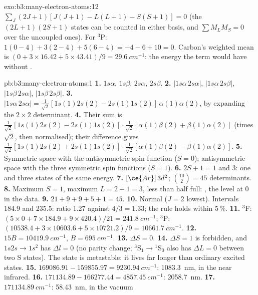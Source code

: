 \begin{solution}{exo:b3:many-electron-atoms:12}
$\sum_J(2J+1)[J(J+1) - L(L+1) - S(S+1)] = 0$ (the $(2L+1)(2S+1)$ states can
be counted in either basis, and $\sum M_LM_S = 0$ over the uncoupled ones).
For ${}^3$P: $1(0 - 4) + 3(2 - 4) + 5(6 - 4) = -4 - 6 + 10 = 0$. Carbon's
weighted mean is $(0 + 3 \times 16.42 + 5 \times 43.41)/9 = \qty{29.6}{cm^{-1}}$:
the energy the term would have without .
\end{solution}

\begin{solution}{pb:b3:many-electron-atoms:1}
\textbf{1.} $1s\alpha$, $1s\beta$, $2s\alpha$, $2s\beta$.
\textbf{2.} $|1s\alpha\,2s\alpha|$, $|1s\alpha\,2s\beta|$, $|1s\beta\,2s\alpha|$,
$|1s\beta\,2s\beta|$.
\textbf{3.} $|1s\alpha\,2s\alpha| = \frac{1}{\sqrt2}[1s(1)2s(2) - 2s(1)1s(2)]\,
\alpha(1)\alpha(2)$, by expanding the $2\times2$ determinant.
\textbf{4.} Their sum is $\frac{1}{\sqrt2}[1s(1)2s(2) - 2s(1)1s(2)]\cdot
\frac{1}{\sqrt2}[\alpha(1)\beta(2) + \beta(1)\alpha(2)]$ (times $\sqrt2$, then
normalised); their difference gives $\frac{1}{\sqrt2}[1s(1)2s(2) +
2s(1)1s(2)]\cdot\frac{1}{\sqrt2}[\alpha(1)\beta(2) - \beta(1)\alpha(2)]$.
\textbf{5.} Symmetric space with the antisymmetric spin function ($S = 0$);
antisymmetric space with the three symmetric spin functions ($S = 1$).
\textbf{6.} $2S + 1 = 1$ and 3: one and three states of the same energy.
\textbf{7.} $[\ce{Ar}]\,3d^2$; $\binom{10}{2} = 45$ determinants.
\textbf{8.} Maximum $S = 1$, maximum $L = 2 + 1 = 3$, less than half full:
, the level at 0 in the data.
\textbf{9.} $21 + 9 + 9 + 5 + 1 = 45$.
\textbf{10.} Normal ($J = 2$ lowest). Intervals 184.9 and 235.5: ratio 1.27
against $4/3 = 1.33$; the rule holds within 5\,\%.
\textbf{11.} ${}^3$F: $(5 \times 0 + 7 \times 184.9 + 9 \times 420.4)/21 =
\qty{241.8}{cm^{-1}}$; ${}^3$P: $(10538.4 + 3 \times 10603.6 + 5 \times
10721.2)/9 = \qty{10661.7}{cm^{-1}}$.
\textbf{12.} $15B = \qty{10419.9}{cm^{-1}}$, $B = \qty{695}{cm^{-1}}$.
\textbf{13.} $\Delta S = 0$.
\textbf{14.} $\Delta S = 1$ is forbidden, and $1s2s \to 1s^2$ has $\Delta l = 0$
(no parity change; ${}^3$S$_1 \to {}^1$S$_0$ also has $\Delta L = 0$ between two S
states). The state is metastable: it lives far longer than ordinary excited
states.
\textbf{15.} $169086.91 - 159855.97 = \qty{9230.94}{cm^{-1}}$: \qty{1083.3}{nm}, in
the near infrared.
\textbf{16.} $171134.89 - 166277.44 = \qty{4857.45}{cm^{-1}}$: \qty{2058.7}{nm}.
\textbf{17.} $\qty{171134.89}{cm^{-1}}$: \qty{58.43}{nm}, in the vacuum

\end{solution}

